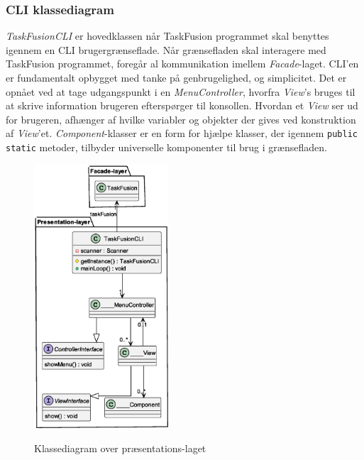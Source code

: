\subsubsection{CLI klassediagram}
\textit{TaskFusionCLI} er hovedklassen når TaskFusion programmet skal benyttes igennem en CLI brugergrænseflade. Når grænsefladen skal interagere med TaskFusion programmet, foregår al kommunikation imellem \textit{Facade}-laget. CLI'en er fundamentalt opbygget med tanke på genbrugelighed, og simplicitet. Det er opnået ved at tage udgangspunkt i en \textit{MenuController}, hvorfra \textit{View}'s bruges til at skrive information brugeren efterspørger til konsollen. Hvordan et \textit{View} ser ud for brugeren, afhænger af hvilke variabler og objekter der gives ved konstruktion af \textit{View}'et. \textit{Component}-klasser er en form for hjælpe klasser, der igennem \texttt{public static} metoder, tilbyder universelle komponenter til brug i grænsefladen.
\begin{figure}[H]
    \centering
    \caption{Klassediagram over præsentations-laget}
    \includegraphics[width = 5cm]{ImplementationAndTest/Diagrams/ClassDiagrams/TaskFusion-CLI.eps}
    \label{fig:class_cli}
\end{figure}
